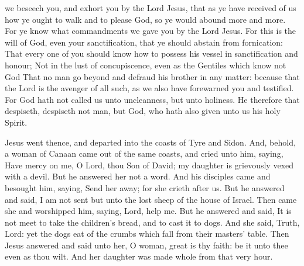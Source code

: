  we beseech you, and exhort you by the Lord Jesus, that as ye have received of us how ye ought to walk and to please God, so ye would abound more and more. For ye know what commandments we gave you by the Lord Jesus. For this is the will of God, even your sanctification, that ye should abstain from fornication: That every one of you should know how to possess his vessel in sanctification and honour; Not in the lust of concupiscence, even as the Gentiles which know not God That no man go beyond and defraud his brother in any matter: because that the Lord is the avenger of all such, as we also have forewarned you and testified. For God hath not called us unto uncleanness, but unto holiness. He therefore that despiseth, despiseth not man, but God, who hath also given unto us his holy Spirit.


 Jesus went thence, and departed into the coasts of Tyre and Sidon. And, behold, a woman of Canaan came out of the same coasts, and cried unto him, saying, Have mercy on me, O Lord, thou Son of David; my daughter is grievously vexed with a devil. But he answered her not a word. And his disciples came and besought him, saying, Send her away; for she crieth after us. But he answered and said, I am not sent but unto the lost sheep of the house of Israel. Then came she and worshipped him, saying, Lord, help me. But he answered and said, It is not meet to take the children's bread, and to cast it to dogs. And she said, Truth, Lord: yet the dogs eat of the crumbs which fall from their masters' table. Then Jesus answered and said unto her, O woman, great is thy faith: be it unto thee even as thou wilt. And her daughter was made whole from that very hour.


